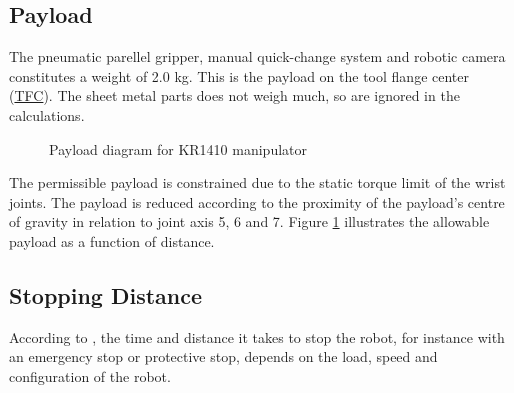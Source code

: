 \subsection{Payload}
The pneumatic parellel gripper, manual quick-change system and robotic camera constitutes a weight of 2.0 kg.
This is the payload on the tool flange center (\hyperref[acro:TFC]{TFC}). The sheet metal parts does not weigh much,
so are ignored in the calculations.


\begin{figure}[h]
    \centering
    
    \caption{Payload diagram for KR1410 manipulator}
    \label{fig:kr1410-payload-diagram}
\end{figure}


The permissible payload is constrained due to the static torque limit of the wrist joints. The payload is
reduced according to the proximity of the payload's centre of gravity in relation to joint axis 5, 6 and 7. \cite[page 35]{kassow-manual} Figure \ref{fig:kr1410-payload-diagram}
illustrates the allowable payload as a function of distance.

\subsection{Stopping Distance}
According to \cite[page 35]{kassow-manual}, the time and distance it takes to stop the robot, for instance with an emergency stop or protective stop, depends on the load, speed
and configuration of the robot.

